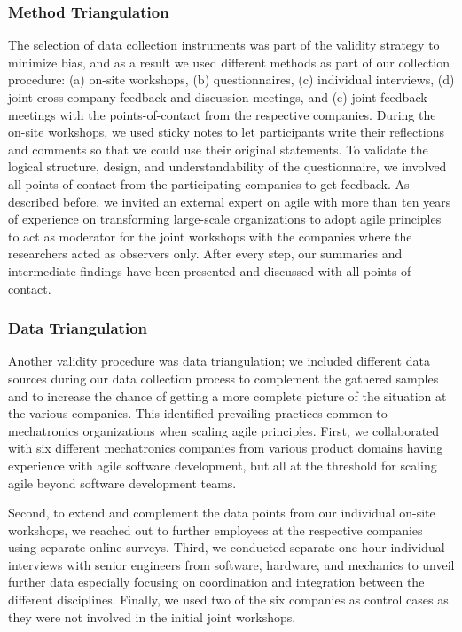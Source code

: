 \documentclass[10pt,a4paper]{IEEEtran} %
\begin{document}
\subsubsection{Method Triangulation}
The selection of data collection instruments was part of the validity strategy to minimize bias, and as a result we
used different methods as part of our collection procedure: (a) on-site workshops, (b) questionnaires, (c) individual interviews, (d) joint cross-company feedback and discussion meetings, and (e) joint feedback meetings with the points-of-contact from the respective companies.
During the on-site workshops, we used sticky notes to let participants write their reflections and comments so that we could use their original statements. To validate the logical structure, design, and understandability of the questionnaire, we involved all points-of-contact from the
participating companies to get feedback.
As described before, we invited an external
expert on agile with more than ten years of experience on transforming large-scale organizations to adopt agile principles to act as moderator for the joint workshops with the companies where the researchers acted as observers only.
After every step, our summaries and intermediate findings have been presented and discussed with all points-of-contact.

\subsubsection{Data Triangulation}
Another validity procedure was data triangulation;  we included different data sources during our data collection process to complement
the gathered samples and to increase the chance of getting a more complete picture
of the situation at the various companies. This  identified prevailing practices common
to mechatronics organizations when scaling agile principles. First, we
collaborated with six different mechatronics companies from various product domains having experience with agile software development, but all at the threshold for scaling agile beyond
software development teams. 

Second, to extend and complement the data points from our individual on-site workshops, we reached out to further employees at the respective
companies using separate online surveys. Third, we conducted separate one hour individual interviews with senior engineers from software, hardware, and mechanics to unveil further data especially focusing on 
coordination and integration
between the different disciplines. Finally, we used two of the six companies as control cases as they were not involved in the initial joint workshops.
\end{document}
